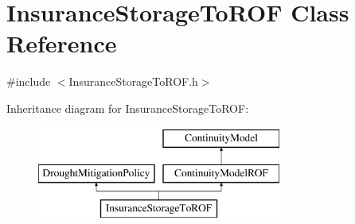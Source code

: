 \hypertarget{classInsuranceStorageToROF}{}\section{Insurance\+Storage\+To\+R\+OF Class Reference}
\label{classInsuranceStorageToROF}


{\ttfamily \#include $<$Insurance\+Storage\+To\+R\+O\+F.\+h$>$}

Inheritance diagram for Insurance\+Storage\+To\+R\+OF\+:\begin{figure}[H]
\begin{center}
\leavevmode
\includegraphics[height=3.000000cm]{classInsuranceStorageToROF}
\end{center}
\end{figure}
